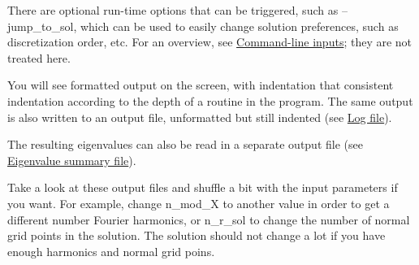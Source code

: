 There are optional run-\/time options that can be triggered, such as {\ttfamily --jump\+\_\+to\+\_\+sol}, which can be used to easily change solution preferences, such as discretization order, etc. For an overview, see \hyperlink{page_inputs_inputs_POST_cmd}{Command-\/line inputs}; they are not treated here.

You will see formatted output on the screen, with indentation that consistent indentation according to the depth of a routine in the program. The same output is also written to an output file, unformatted but still indented (see \hyperlink{page_outputs_output_file_log}{Log file}).

The resulting eigenvalues can also be read in a separate output file (see \hyperlink{page_outputs_output_file_EV}{Eigenvalue summary file}).

Take a look at these output files and shuffle a bit with the input parameters if you want. For example, change {\ttfamily n\+\_\+mod\+\_\+X} to another value in order to get a different number Fourier harmonics, or {\ttfamily n\+\_\+r\+\_\+sol} to change the number of normal grid points in the solution. The solution should not change a lot if you have enough harmonics and normal grid poins.

